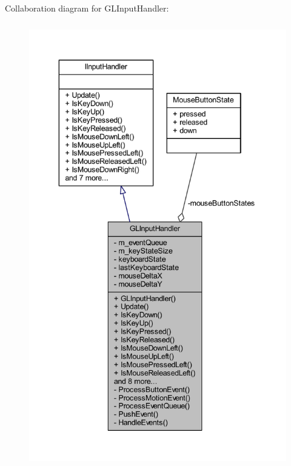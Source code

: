 Collaboration diagram for G\+L\+Input\+Handler\+:\nopagebreak
\begin{figure}[H]
\begin{center}
\leavevmode
\includegraphics[height=550pt]{class_g_l_input_handler__coll__graph}
\end{center}
\end{figure}

